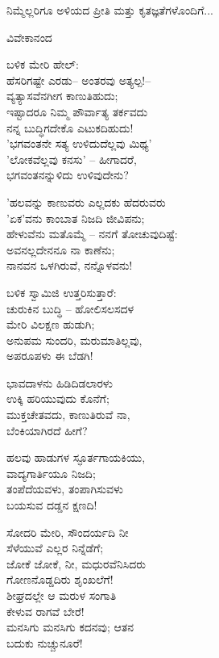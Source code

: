 ನಿಮ್ಮೆಲ್ಲರಿಗೂ ಅಳಿಯದ ಪ್ರೀತಿ ಮತ್ತು ಕೃತಜ್ಞತೆಗಳೊಂದಿಗೆ...

\begin{flushright}
ವಿವೇಕಾನಂದ
\end{flushright}

\begin{myquote}
ಬಳಿಕ ಮೇರಿ ಹೇಲ್:\\ಹೆಸರಿಗಷ್ಟೇ ಎರಡು– ಅಂತರವು ಅತ್ಯಲ್ಪ!–\\ವ್ಯತ್ಯಾಸವೆನಗೀಗ ಕಾಣುತಿಹುದು;\\ಇಷ್ಟಾದರೂ ನಿಮ್ಮ ಪೌರ್ವಾತ್ಯ ತರ್ಕವದು\\ನನ್ನ ಬುದ್ಧಿಗದೇಕೊ ಎಟುಕದಿಹುದು!\\'ಭಗವಂತನೇ ಸತ್ಯ ಉಳಿದುದೆಲ್ಲವು ಮಿಥ್ಯ'\\'ಲೋಕವೆಲ್ಲವು ಕನಸು' – ಹೀಗಾದರೆ,\\ಭಗವಂತನನ್ನುಳಿದು ಉಳಿವುದೇನು?
\end{myquote}

\begin{myquote}
'ಹಲವನ್ನು ಕಾಣುವರು ಎಲ್ಲದಕು ಹೆದರುವರು\\'ಏಕ'ವನು ಕಾಂಬಾತ ನಿಜದಿ ಜೀವಿಪನು;\\ಹೇಳುವೆನು ಮತೊಮ್ಮೆ – ನನಗೆ ತೋಚುವುದಿಷ್ಟೆ:\\ಅವನಲ್ಲದೇನನೂ ನಾ ಕಾಣೆನು;\\ನಾನವನ ಒಳಗಿರುವೆ, ನನ್ನೊಳವನು!
\end{myquote}

\begin{myquote}
ಬಳಿಕ ಸ್ವಾಮಿಜಿ ಉತ್ತರಿಸುತ್ತಾರೆ:\\ಚುರುಕಿನ ಬುದ್ಧಿ – ಹೋಲಿಸಲಸದಳ\\ಮೇರಿ ವಿಲಕ್ಷಣ ಹುಡುಗಿ;\\ಅನುಪಮ ಸುಂದರಿ, ಮರುಮಾತಿಲ್ಲವು,\\ಅಪರೂಪಳು ಈ ಬೆಡಗಿ!
\end{myquote}

\begin{myquote}
ಭಾವದಾಳನು ಹಿಡಿದಿಡಲಾರಳು\\ಉಕ್ಕಿ ಹರಿಯುವುದು ಕೊನೆಗೆ;\\ಮುಕ್ತಚೇತವದು, ಕಾಣುತಿರುವೆ ನಾ,\\ಬೆಂಕಿಯಾಗಿರದೆ ಹೀಗೆ?
\end{myquote}

\begin{myquote}
ಹಲವು ಹಾಡುಗಳ ಸ್ಫೂರ್ತಗಾಯಕಿಯು,\\ವಾದ್ಯಗಾರ್ತಿಯೂ ನಿಜದಿ;\\ತಂಪೆದೆಯವಳು, ತಂಪಾಗಿಸುವಳು\\ಬಯಸುವ ದಡ್ಡನ ಕ್ಷಣದಿ!
\end{myquote}

\begin{myquote}
ಸೋದರಿ ಮೇರಿ, ಸೌಂದರ್ಯದಿ ನೀ\\ಸೆಳೆಯುವೆ ಎಲ್ಲರ ನಿನ್ನೆಡೆಗೆ;\\ಜೋಕೆ ಜೋಕೆ, ನೀ, ಮಧುರವೆನಿಸಿದರು\\ಗೋಣನೊಡ್ಡದಿರು ಶೃಂಖಲೆಗೆ!\\ಶೀಘ್ರದಲ್ಲೇ ಆ ಮರುಳ ಸಂಗಾತಿ\\ಕೇಳುವ ರಾಗವೆ ಬೇರೆ!\\ಮನಸಿಗು ಮನಸಿಗು ಕದನವು; ಆತನ\\ಬದುಕು ನುಚ್ಚುನೂರೆ!
\end{myquote}

